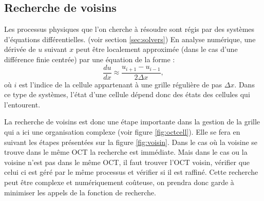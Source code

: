

\subsection{Recherche de voisins}
\label{sec:voisins}

Les processus physiques que l'on cherche à résoudre sont régis par des systèmes d'équations différentielles. (voir section \ref{sec:solvers})
En analyse numérique, une dérivée de $u$ suivant $x$ peut être localement approximée (dans le cas d'une différence finie centrée) par une équation de la forme :
\begin{equation}
\frac{d u}{dx} \approx \frac{u_{i+1}  - u_{i-1}}{2\Delta x}, 
\end{equation}
où $i$ est l'indice de la cellule appartenant à une grille régulière de pas $\Delta x$.
Dans ce type de systèmes, l'état d'une cellule dépend donc des états des cellules qui l'entourent.

La recherche de voisins est donc une étape importante dans la gestion de la grille qui a ici une organisation complexe (voir figure \ref{fig:octcell}).
Elle se fera en suivant les étapes présentées sur la figure \ref{fig:voisin}.
Dans le cas où la voisine se trouve dans le même OCT la recherche est immédiate.
Mais dans le cas ou la voisine n'est pas dans le même OCT, il faut trouver l'OCT voisin, vérifier que celui ci est géré par le même processus et vérifier si il est raffiné.
Cette recherche peut être complexe et numériquement coûteuse, on prendra donc garde à minimiser les appels de la fonction de recherche. 

